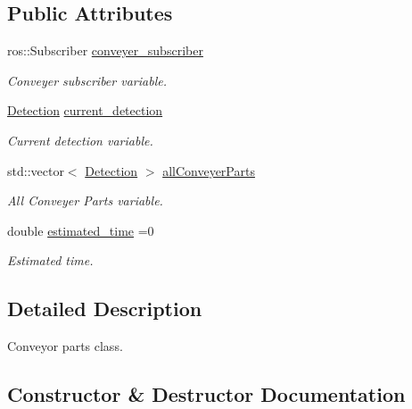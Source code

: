 \subsection*{Public Attributes}
\begin{DoxyCompactItemize}
\item 
\mbox{\label{classConveyerParts_a8cd52489a957397b51b4e1be2bcd84d9}} 
ros\+::\+Subscriber \hyperlink{classConveyerParts_a8cd52489a957397b51b4e1be2bcd84d9}{conveyer\+\_\+subscriber}
\begin{DoxyCompactList}\small\item\em Conveyer subscriber variable. \end{DoxyCompactList}\item 
\mbox{\label{classConveyerParts_aa604a79b48159e651800911a4c26a13d}} 
\hyperlink{classDetection}{Detection} \hyperlink{classConveyerParts_aa604a79b48159e651800911a4c26a13d}{current\+\_\+detection}
\begin{DoxyCompactList}\small\item\em Current detection variable. \end{DoxyCompactList}\item 
std\+::vector$<$ \hyperlink{classDetection}{Detection} $>$ \hyperlink{classConveyerParts_ab75ade698ffee71ccf3792d22917eb95}{all\+Conveyer\+Parts}
\begin{DoxyCompactList}\small\item\em All Conveyer Parts variable. \end{DoxyCompactList}\item 
\mbox{\label{classConveyerParts_a4147928a7d87b11ad6dfa179cbfc3a5c}} 
double \hyperlink{classConveyerParts_a4147928a7d87b11ad6dfa179cbfc3a5c}{estimated\+\_\+time} =0
\begin{DoxyCompactList}\small\item\em Estimated time. \end{DoxyCompactList}\end{DoxyCompactItemize}


\subsection{Detailed Description}
Conveyor parts class. 

\subsection{Constructor \& Destructor Documentation}
\mbox{\label{classConveyerParts_a0b511cdd3b2d0c0587901b1443f43d49}} 
